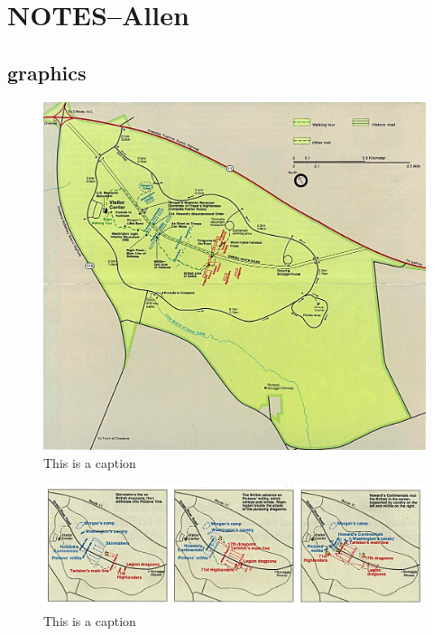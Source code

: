 
\section{NOTES--Allen}

\subsection{graphics}

\lipsum[1]
\begin{figure}[h]
	\singlespacing
	\begin{center}
	\includegraphics[width=6in]{gfx/cowp_95}
	\end{center}
	\caption{This is a caption}
	\label{cowpbatt95}
\end{figure}


\lipsum[2]
\begin{figure}[h]
	\singlespacing
	\begin{center}
	\includegraphics[width=6in]{gfx/cowp_batt95}
	\end{center}
	\caption{This is a caption}
	\label{cowp95}
\end{figure}

